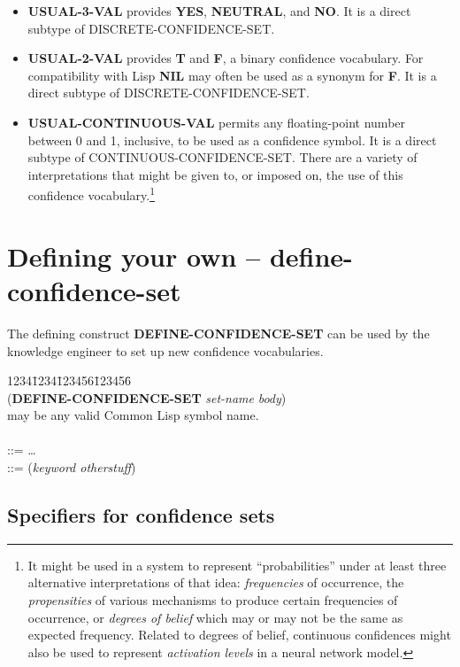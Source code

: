 \begin{itemize}
\item
{\bf USUAL-3-VAL} provides {\bf YES}, {\bf NEUTRAL}, and {\bf NO}. It
is a direct subtype of DISCRETE-CONFIDENCE-SET. 

\item
{\bf USUAL-2-VAL} provides {\bf T} and {\bf F}, a binary confidence
vocabulary.  For compatibility with Lisp {\bf NIL} may often be used
as a synonym for {\bf F}. It is a direct subtype of
DISCRETE-CONFIDENCE-SET.

\item
{\bf USUAL-CONTINUOUS-VAL} permits any floating-point number between 0
and 1, inclusive, to be used as a confidence symbol. It is a direct
subtype of CONTINUOUS-CONFIDENCE-SET.  There are a variety of
interpretations that might be given to, or imposed on, the use of this
confidence vocabulary.\footnote{It might be used in a system to
represent ``probabilities'' under at least three alternative
interpretations of that idea: {\it frequencies\/} of occurrence, the
{\it propensities\/} of various mechanisms to produce certain
frequencies of occurrence, or {\it degrees of belief\/} which may or
may not be the same as expected frequency.  Related to degrees of
belief, continuous confidences might also be used to represent {\it
activation levels\/} in a neural network model.}
\end{itemize}

\section{Defining your own -- define-confidence-set}

The defining construct {\bf DEFINE-CONFIDENCE-SET} can be used by the
knowledge engineer to set up new confidence vocabularies.


\begin{tabbing}
1234\=1234\=123456\=123456\= \kill
\\
\>({\bf DEFINE-CONFIDENCE-SET} {\it set-name} {\it body\/}) \\
\> may be any valid Common Lisp symbol name. \\
\\
\> \>::=  \ldots \\
\> \>::= \>({\it keyword otherstuff\/})
\\
\end{tabbing}

\subsection{Specifiers for confidence sets}

